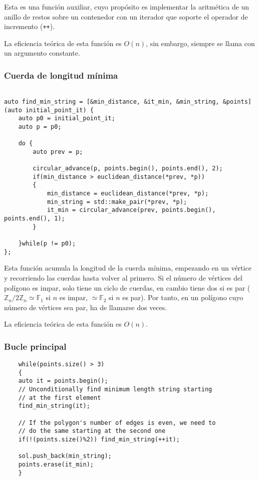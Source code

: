 \documentclass[a4paper, 11pt]{article}
\begin{document}
Esta es una función auxiliar, cuyo propósito es implementar la aritmética de un anillo de restos sobre un contenedor con un iterador que soporte el operador de incremento (\texttt{++}).

La eficiencia teórica de esta función es $O(n)$, sin embargo, siempre se llama con un argumento constante.

\subsubsection{Cuerda de longitud mínima}
\begin{lstlisting}
	
auto find_min_string = [&min_distance, &it_min, &min_string, &points](auto initial_point_it) {
	auto p0 = initial_point_it;
	auto p = p0;
	
	do {
		auto prev = p;
	
		circular_advance(p, points.begin(), points.end(), 2);
		if(min_distance > euclidean_distance(*prev, *p))
		{
			min_distance = euclidean_distance(*prev, *p);
			min_string = std::make_pair(*prev, *p);
			it_min = circular_advance(prev, points.begin(), points.end(), 1);
		}
	
	}while(p != p0);
};
\end{lstlisting}

Esta función acumula la longitud de la cuerda mínima, empezando en un vértice y recorriendo las cuerdas hasta volver al primero. Si el número de vértices del polígono es impar, solo tiene un ciclo de cuerdas, en cambio tiene dos si es par ($\mathbb{Z}_n/2\mathbb{Z}_n \simeq \mathbb{F}_1$ si $n$ es impar, $\simeq \mathbb{F}_2$ si $n$ es par). Por tanto, en un polígono cuyo número de vértices sea par, ha de llamarse dos veces.

La eficiencia teórica de esta función es $O(n)$.
\subsubsection{Bucle principal}

	\begin{lstlisting}
	while(points.size() > 3)
	{
	auto it = points.begin();
	// Unconditionally find minimum length string starting
	// at the first element
	find_min_string(it);
	
	// If the polygon's number of edges is even, we need to
	// do the same starting at the second one
	if(!(points.size()%2)) find_min_string(++it);
	
	sol.push_back(min_string);
	points.erase(it_min);
	}
	\end{lstlisting}
	
\end{document}
